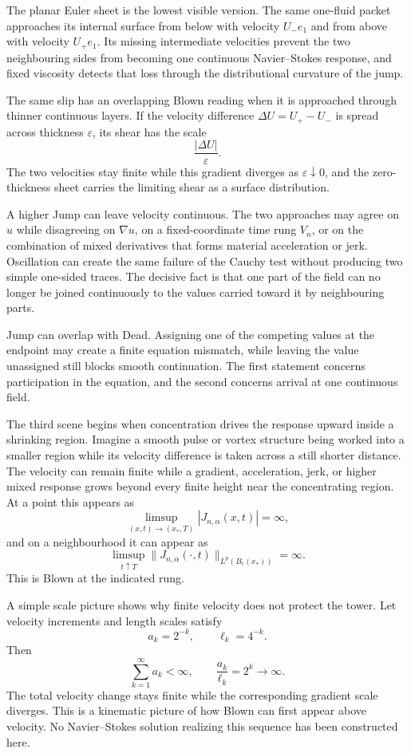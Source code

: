 The planar Euler sheet is the lowest visible version.
The same one-fluid packet approaches its internal surface from below with velocity \(U_-e_1\) and from above with velocity \(U_+e_1\).
Its missing intermediate velocities prevent the two neighbouring sides from becoming one continuous Navier--Stokes response, and fixed viscosity detects that loss through the distributional curvature of the jump.

The same slip has an overlapping Blown reading when it is approached through thinner continuous layers.
If the velocity difference \(\Delta U=U_+-U_-\) is spread across thickness \(\varepsilon\), its shear has the scale
\[
  \frac{|\Delta U|}{\varepsilon}.
\]
The two velocities stay finite while this gradient diverges as \(\varepsilon\downarrow0\), and the zero-thickness sheet carries the limiting shear as a surface distribution.

A higher Jump can leave velocity continuous.
The two approaches may agree on \(u\) while disagreeing on \(\nabla u\), on a fixed-coordinate time rung \(V_n\), or on the combination of mixed derivatives that forms material acceleration or jerk.
Oscillation can create the same failure of the Cauchy test without producing two simple one-sided traces.
The decisive fact is that one part of the field can no longer be joined continuously to the values carried toward it by neighbouring parts.

Jump can overlap with Dead.
Assigning one of the competing values at the endpoint may create a finite equation mismatch, while leaving the value unassigned still blocks smooth continuation.
The first statement concerns participation in the equation, and the second concerns arrival at one continuous field.


The third scene begins when concentration drives the response upward inside a shrinking region.
Imagine a smooth pulse or vortex structure being worked into a smaller region while its velocity difference is taken across a still shorter distance.
The velocity can remain finite while a gradient, acceleration, jerk, or higher mixed response grows beyond every finite height near the concentrating region.
At a point this appears as
\[
  \limsup_{(x,t)\to(x_*,T)}
  |J_{n,\alpha}(x,t)|
  =\infty,
\]
and on a neighbourhood it can appear as
\[
  \limsup_{t\uparrow T}
  \lVert J_{n,\alpha}(\cdot,t)\rVert_{L^p(B_r(x_*))}
  =\infty.
\]
This is Blown at the indicated rung.

A simple scale picture shows why finite velocity does not protect the tower.
Let velocity increments and length scales satisfy
\[
  a_k=2^{-k},
  \qquad
  \ell_k=4^{-k}.
\]
Then
\[
  \sum_{k=1}^\infty a_k<\infty,
  \qquad
  \frac{a_k}{\ell_k}=2^k\longrightarrow\infty.
\]
The total velocity change stays finite while the corresponding gradient scale diverges.
This is a kinematic picture of how Blown can first appear above velocity.
No Navier--Stokes solution realizing this sequence has been constructed here.

